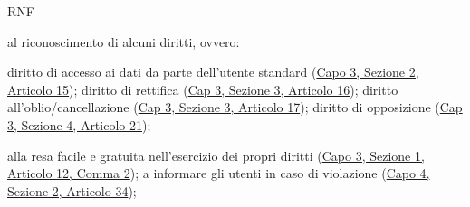 \begin{listaPersonale}{RNF}
\begin{listaPersonale2}[RNF]{}
         al riconoscimento di alcuni diritti, ovvero:
        \begin{listaPersonale3}[RNF]{}
             diritto di accesso ai dati da parte dell'utente standard (\href{https://eur-lex.europa.eu/legal-content/IT/TXT/?uri=uriserv:OJ.L_.2016.119.01.0001.01.ITA&toc=OJ:L:2016:119:TOC#d1e2520-1-1}{Capo 3, Sezione 2, Articolo 15});
             diritto di rettifica (\href{https://eur-lex.europa.eu/legal-content/IT/TXT/?uri=uriserv:OJ.L_.2016.119.01.0001.01.ITA&toc=OJ:L:2016:119:TOC#d1e2606-1-1}{Cap 3, Sezione 3, Articolo 16});
             diritto all'oblio/cancellazione (\href{https://eur-lex.europa.eu/legal-content/IT/TXT/?uri=uriserv:OJ.L_.2016.119.01.0001.01.ITA&toc=OJ:L:2016:119:TOC#d1e2613-1-1}{Cap 3, Sezione 3, Articolo 17});
             diritto di opposizione (\href{https://eur-lex.europa.eu/legal-content/IT/TXT/?uri=uriserv:OJ.L_.2016.119.01.0001.01.ITA&toc=OJ:L:2016:119:TOC#d1e2810-1-1}{Cap 3, Sezione 4, Articolo 21});
        \end{listaPersonale3}

         alla resa facile e gratuita nell'esercizio dei propri diritti (\href{https://eur-lex.europa.eu/legal-content/IT/TXT/?uri=uriserv:OJ.L_.2016.119.01.0001.01.ITA&toc=OJ:L:2016:119:TOC#d1e2189-1-1}{Capo 3, Sezione 1, Articolo 12, Comma 2});
         a informare gli utenti in caso di violazione (\href{https://eur-lex.europa.eu/legal-content/IT/TXT/?uri=uriserv:OJ.L_.2016.119.01.0001.01.ITA&toc=OJ:L:2016:119:TOC#d1e3497-1-1}{Capo 4, Sezione 2, Articolo 34});
    \end{listaPersonale2}



\end{listaPersonale}
